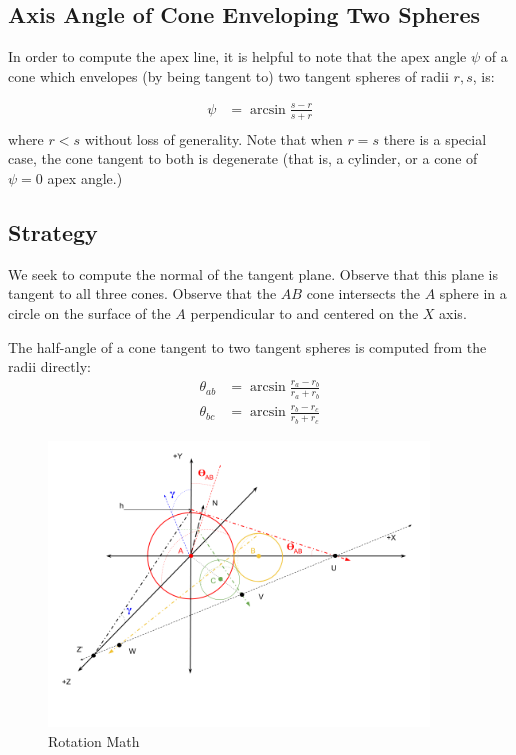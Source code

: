 \documentclass{article}
\begin{document}
\subsection{Axis Angle of Cone Enveloping Two Spheres}

In order to compute the apex line, it is helpful
to note that the apex angle $\psi$ of a cone which envelopes (by being tangent to) two tangent
spheres of radii $r,s$, is:

\begin{align}
 \psi &= \arcsin{\frac{s - r}{s + r}} \\
\end{align}
where $r < s$ without loss of generality. Note that when $r = s$
there is a special case,
the cone tangent to both is degenerate (that is, a cylinder, or a cone of
$\psi = 0$ apex angle.)

\subsection{Strategy}

We seek to compute the normal of the tangent plane.
Observe that this plane is tangent to all three cones.
Observe that the $AB$ cone intersects
the $A$ sphere in a circle on the surface of the $A$ perpendicular to and centered on the $X$ axis.

The half-angle of a cone tangent to two tangent spheres is computed from the radii directly:
\begin{align}
  \theta_{ab} &= \arcsin{\frac{r_a - r_b}{r_a + r_b}} \label{eq:theta}\\
  \theta_{bc} &= \arcsin{\frac{r_b - r_c}{r_b + r_c}}
\end{align}


\begin{figure}
     \centering
     \includegraphics[width=0.9\textwidth]{figures/RotationMath.png}
     \caption{Rotation Math}
  \label{fig:rotation}
\end{figure}
\end{document}
